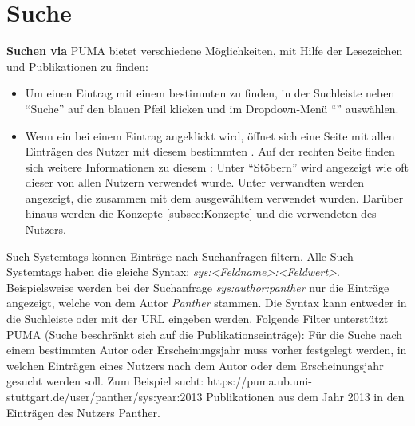 \section{Suche}
\label{itm:suchSystemtag}
\textbf{Suchen \label{Suche} via \tags}\newline
PUMA bietet verschiedene Möglichkeiten, mit Hilfe der \tags Lesezeichen und Publikationen zu finden: \\
\begin{itemize}
\item Um einen Eintrag mit einem bestimmten \tag zu finden, in der Suchleiste neben \enquote{Suche} auf den blauen Pfeil klicken und im Dropdown-Menü \enquote{\tag} auswählen. \\
\item Wenn ein \tag bei einem Eintrag angeklickt wird, öffnet sich eine Seite mit allen Einträgen des Nutzer mit diesem bestimmten \tag. Auf der rechten Seite finden sich weitere Informationen zu diesem \tag: Unter \enquote{Stöbern} wird angezeigt wie oft dieser \tag von allen Nutzern verwendet wurde. Unter verwandten \tags werden \tags angezeigt, die zusammen mit dem ausgewähltem \tag verwendet wurden. Darüber hinaus werden die Konzepte \autoref{subsec:Konzepte} und die verwendeten \tags des Nutzers.\\
\end{itemize}
Such-Systemtags können Einträge nach Suchanfragen filtern. Alle Such-Systemtags haben die gleiche Syntax: \textit{sys:<Feldname>:<Feldwert>}. Beispielsweise werden  bei der Suchanfrage \textit{sys:author:panther} nur die Einträge angezeigt, welche von dem Autor \textit{Panther} stammen.\newline
Die Syntax kann entweder in die Suchleiste oder mit der URL eingeben werden. Folgende Filter unterstützt PUMA (Suche beschränkt sich auf die Publikationseinträge):\newline
\newline
Für die Suche nach einem bestimmten Autor oder Erscheinungsjahr muss vorher festgelegt werden, in welchen Einträgen eines Nutzers nach dem Autor oder dem Erscheinungsjahr gesucht werden soll. Zum Beispiel sucht: \newline https://puma.ub.uni-stuttgart.de/user/panther/sys:year:2013 \newline Publikationen aus dem Jahr 2013 in den Einträgen des Nutzers Panther. 
